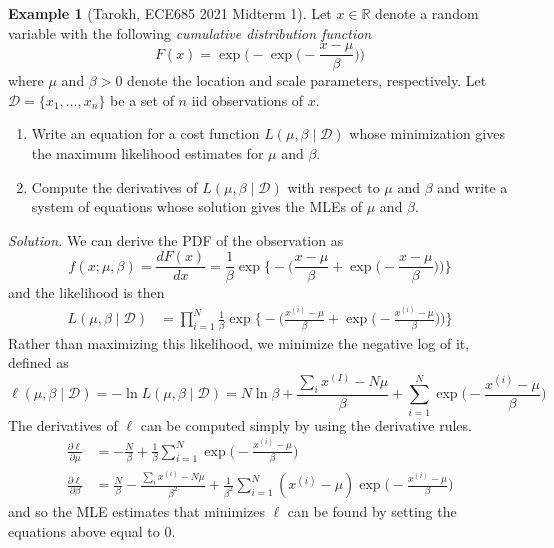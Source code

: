 \documentclass{article}
\theoremstyle{definition}
\newtheorem{example}{Example}[section]
\theoremstyle{remark}
\theoremstyle{definition}
\newenvironment{solution}{\noindent \textit{Solution.}}{}
\begin{document}
\begin{example}[Tarokh, ECE685 2021 Midterm 1]
Let $x \in \mathbb{R}$ denote a random variable with the following \textit{cumulative distribution function} 
\[F(x) = \exp \bigg( - \exp \bigg( - \frac{x - \mu}{\beta} \bigg) \bigg) \] 
where $\mu$ and $\beta > 0$ denote the location and scale parameters, respectively. Let $\mathcal{D} = \{x_1, \ldots, x_n\}$ be a set of $n$ iid observations of $x$. 
\begin{enumerate}
    \item Write an equation for a cost function $L(\mu, \beta \mid \mathcal{D})$ whose minimization gives the maximum likelihood estimates for $\mu$ and $\beta$. 
    \item Compute the derivatives of $L(\mu, \beta \mid \mathcal{D})$ with respect to $\mu$ and $\beta$ and write a system of equations whose solution gives the MLEs of $\mu$ and $\beta$. 
\end{enumerate}
\end{example}

\begin{solution}
We can derive the PDF of the observation as 
\[f(x; \mu, \beta) = \frac{d F(x)}{dx} = \frac{1}{\beta} \exp \bigg\{ - \bigg( \frac{x - \mu}{\beta} + \exp \Big( - \frac{x - \mu}{\beta}\Big) \bigg) \bigg\}\] 
and the likelihood is then 
\begin{align*}
    L(\mu, \beta \mid \mathcal{D}) & = \prod_{i=1}^N \frac{1}{\beta} \exp \bigg\{ - \bigg( \frac{x^{(i)} - \mu}{\beta} + \exp \Big( - \frac{x^{(i)} - \mu}{\beta}\Big) \bigg) \bigg\}
\end{align*}
Rather than maximizing this likelihood, we minimize the negative log of it, defined as 
\[ \ell(\mu, \beta \mid \mathcal{D}) = - \ln L(\mu, \beta \mid \mathcal{D}) = N \ln{\beta} + \frac{\sum_{i} x^{(I)} - N \mu}{\beta} + \sum_{i=1}^N \exp \Big( - \frac{x^{(i)} - \mu}{\beta} \Big) \]    
The derivatives of $\ell$ can be computed simply by using the derivative rules.  
\begin{align*}
    \frac{\partial \ell}{\partial \mu} & = - \frac{N}{\beta} + \frac{1}{\beta} \sum_{i=1}^N \exp \Big( - \frac{x^{(i)} - \mu}{\beta} \Big) \\
    \frac{\partial \ell}{\partial \beta} & = \frac{N}{\beta} - \frac{\sum_{i} x^{(i)} - N \mu}{\beta^2} + \frac{1}{\beta^2} \sum_{i=1}^N (x^{(i)} - \mu) \exp \Big( - \frac{x^{(i)} - \mu}{\beta} \Big)
\end{align*}
and so the MLE estimates that minimizes $\ell$ can be found by setting the equations above equal to $0$. 
\end{solution}
\end{document}
